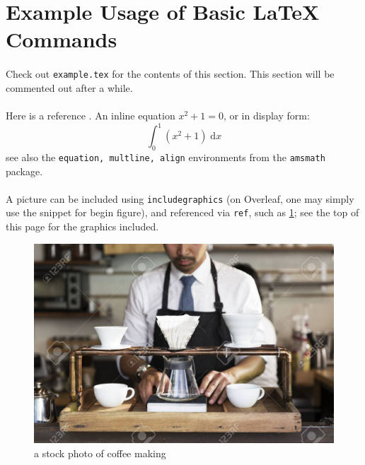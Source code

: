 \newpage
\section*{Example Usage of Basic {\LaTeX} Commands}
\paragraph{}Check out \texttt{example.tex} for the contents of this section. This section will be commented out after a while.
\paragraph{}Here is a reference \cite{example2024}. An inline equation $x^2+1=0$, or in display form:
\[\int_0^1 (x^2+1)\;\mathrm{d}x\]
see also the \texttt{equation, multline, align} environments from the \texttt{amsmath} package.
\paragraph{}A picture can be included using \texttt{includegraphics} (on Overleaf, one may simply use the snippet for begin figure), and referenced via \texttt{ref}, such as \ref{fig:example}; see the top of this page for the graphics included.
\begin{center}
\begin{figure}
    \centering
    \includegraphics[scale=1]{media/coffee.jpg}
    \caption{a stock photo of coffee making}
    \label{fig:example}
\end{figure}
\end{center}
